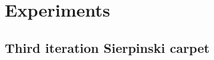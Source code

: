 \documentclass[a4paper,12pt]{article}
\begin{document}
\newpage
\section{Experiments}

\subsection{Third iteration Sierpinski carpet}

%    


\begin{comment}
    Consider a lattice with $N$ atomic sites where each atom contributes exactly one electron to the valence band. Let $\mathbb{C}^N$ be the Hilbert space of our problem, where $N$ is the number of atomic sites. Here, we assume that each atom contributes exactly one electron to the valence band. $N$: $\operatorname{dim}\,\mathcal{H} = N$. The system is described by a hermitian hamiltonian $H \in \mathcal{B}\left(\mathcal{H}\right)$ with eigenenergies $E_i \in \mathbb{R}$ and eigenstates $|\psi_i\rangle \in \mathcal{H}$ (here, $i \in {0,\dots,N-1}$). 
    
    Within the RPA (Random Phase Approximation) we define the dielectic function as follows. Let electrons in the material be subject to an external perturbation $\hat V_\text{ext} \in \mathcal{B}(\mathcal{H})$ Dielectric function $\hat\varepsilon: \mathbb{R} \to \mathcal{B}\left(\mathcal{H}\right)$ is defined by
    \begin{equation*}
    |\phi_\text{ext}\rangle = \hat\varepsilon(\omega)|\phi_\text{tot}(\omega)\rangle\; ,
    \end{equation*}
    where $\phi_\text{tot}\rangle$ is the total potential in 



    We start with a simple tight-binding approximation where only nearest neighbour hoppings are non-zero. By exact diagonalization of the hamiltonian $\mathcal{H} \in \mathbb{C}^{N \times N}$ eigenenergies $E \in \mathbb{R}^N$ and eigenstates $\psi \in \mathbb{C}^{N \times N}$ are obtained.


\end{comment}
\end{document}
